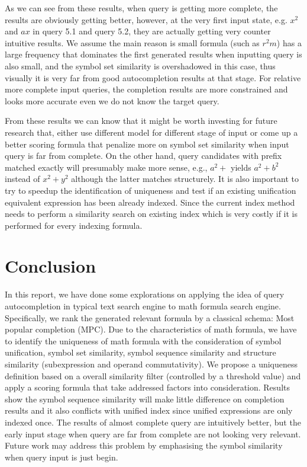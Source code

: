 \documentclass[12pt]{article} %
\begin{document}
As we can see from these results, when query is getting more complete, the results are obviously
getting better, however, at the very first input state, e.g. $x^2$ and $ax$ in query 5.1 and query 5.2, they are actually getting very counter intuitive results.
We assume the main reason is small formula (such as $r^2m$) has a large frequency that dominates the
first generated results when inputting query is also small, and the symbol set similarity is overshadowed in this case, thus visually it is very far from good autocompletion results at that stage.
For relative more complete input queries, the completion results are more constrained and looks more accurate even we do not know the target query.

From these results we can know that it might be worth investing for future research that,
either use different model for different stage of input or come up a better scoring formula that
penalize more on symbol set similarity when input query is far from complete.
On the other hand, query candidates with prefix matched exactly will presumably make more sense, e.g., $a^2 + $ yields $a^2 + b^2 $ instead of $x^2 + y^2$ although the latter matches structurely. 
It is also important to try to speedup the identification of uniqueness and test if an existing unification equivalent expression has been already indexed. Since the current index method needs to perform a similarity search on existing index which is very costly if it is performed for every indexing formula.

\section{Conclusion}
In this report, we have done some explorations on applying the idea of query autocompletion in
typical text search engine to math formula search engine.
Specifically, we rank the generated relevant formula by a classical schema: Most popular completion (MPC).
Due to the characteristics of math formula, we have to identify the uniqueness of math formula with the consideration of symbol unification, symbol set similarity, symbol sequence similarity and structure similarity (subexpression and operand commutativity).
We propose a uniqueness definition based on a overall similarity filter (controlled by a threshold value) and apply a scoring formula that take addressed factors into consideration. 
Results show the symbol sequence similarity will make little difference on completion results and it
also conflicts with unified index since unified expressions are only indexed once.
The results of almost complete query are intuitively better, but the early input stage when query are
far from complete are not looking very relevant. Future work may address this problem by emphasising the symbol similarity when query input is just begin.
{}

\end{document}
